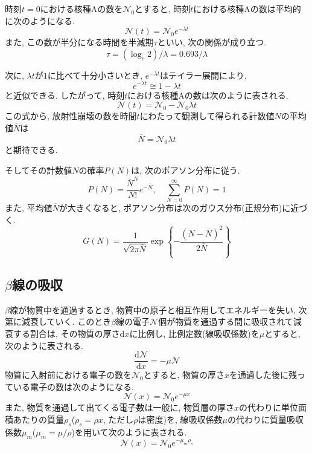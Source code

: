 \documentclass{jarticle}
\begin{document}
時刻$t=0$における核種$\mathrm{A}$の数を$\mathcal{N}_0$とすると, 時刻$t$における核種$\mathrm{A}$の数は平均的に次のようになる.
\begin{equation}
  \mathcal{N}(t) = \mathcal{N}_0 e^{-\lambda t}
\end{equation}
また, この数が半分になる時間を半減期$\tau$といい, 次の関係が成り立つ.
\begin{equation}
  \tau = (\log_e 2)/\lambda
  = 0.693/\lambda
\end{equation}

次に, $\lambda t$が$1$に比べて十分小さいとき, $e^{-\lambda t}$はテイラー展開により,
\begin{equation}
  e^{-\lambda t} \cong 1 - \lambda t
\end{equation}
と近似できる.
したがって, 時刻$t$における核種$\mathrm{A}$の数は次のように表される.
\begin{equation}
  \mathcal{N}(t)=\mathcal{N}_0-\mathcal{N}_0\lambda t
\end{equation}
この式から, 放射性崩壊の数を時間$t$にわたって観測して得られる計数値$N$の平均値$\overline{N}$は
\begin{equation}
  \overline{N} = \mathcal{N}_0\lambda t
\end{equation}
と期待できる.

そしてその計数値$N$の確率$P(N)$は, 次のポアソン分布に従う.
\begin{equation}
  P(N) = \frac{\overline{N}^N}{N!}e^{-\overline{N}}, \quad
  \sum_{N=0}^{\infty} P(N) = 1
\end{equation}
また, 平均値$\overline{N}$が大きくなると, ポアソン分布は次のガウス分布(正規分布)に近づく.
\begin{equation}
  G(N) = \frac{1}{\sqrt{2\pi\overline{N}}} \exp \left\{-\frac{(N-\overline{N})^2}{2\overline{N}}\right\}
\end{equation}


\subsection{$\beta$線の吸収}

$\beta$線が物質中を通過するとき, 物質中の原子と相互作用してエネルギーを失い, 次第に減衰していく.
このとき$\beta$線の電子$\mathcal{N}$個が物質を通過する間に吸収されて減衰する割合は, その物質の厚さ$\mathrm{d}x$に比例し, 比例定数(線吸収係数)を$\mu$とすると, 次のように表される.
\begin{equation}
  \frac{\mathrm{d}\mathcal{N}}{\mathrm{d}x} = -\mu \mathcal{N}
\end{equation}
物質に入射前における電子の数を$\mathcal{N}_0$とすると, 物質の厚さ$x$を通過した後に残っている電子の数は次のようになる.
\begin{equation}
  \mathcal{N}(x) = \mathcal{N}_0 e^{-\mu x}
\end{equation}
また, 物質を通過して出てくる電子数は一般に, 物質層の厚さ$x$の代わりに単位面積あたりの質量$\rho_s$($\rho_s=\rho x$, ただし$\rho$は密度)を, 線吸収係数$\mu$の代わりに質量吸収係数$\mu_m$($\mu_m=\mu/\rho$)を用いて次のように表される.
\begin{equation}
  \mathcal{N}(x) = \mathcal{N}_0 e^{-\mu_m \rho_s}
\end{equation}
\end{document}
